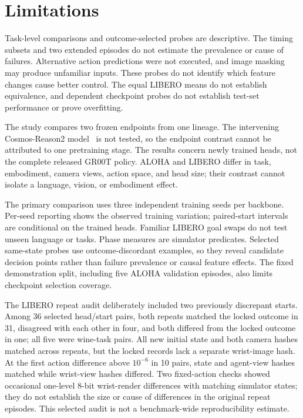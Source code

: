 \documentclass[conference]{IEEEtran}
\begin{document}
\clearpage
\twocolumn
\section{Limitations}
Task-level comparisons and outcome-selected probes are descriptive. The timing
subsets and two extended episodes do not estimate the prevalence or cause of
failures. Alternative action predictions were not executed, and image masking
may produce unfamiliar inputs. These probes do not identify which feature
changes cause better control. The equal LIBERO means do not establish
equivalence, and dependent checkpoint probes do not establish test-set
performance or prove overfitting.

The study compares two frozen endpoints from one lineage. The intervening
Cosmos-Reason2 model~\cite{groot17} is not tested, so the endpoint contrast cannot be
attributed to one pretraining stage. The results concern newly trained heads,
not the complete released GR00T policy. ALOHA and LIBERO differ in task,
embodiment, camera views, action space, and head size; their contrast cannot
isolate a language, vision, or embodiment effect.

The primary comparison uses three independent training seeds per backbone.
Per-seed reporting
shows the observed training variation; paired-start intervals are conditional
on the trained heads. Familiar LIBERO goal swaps do not test unseen language
or tasks.
Phase measures are simulator predicates. Selected same-state probes use
outcome-discordant examples, so they reveal candidate decision points rather
than failure prevalence or causal feature effects. The fixed demonstration
split, including five ALOHA validation episodes, also limits checkpoint
selection coverage.

The LIBERO repeat audit deliberately included two previously discrepant
starts. Among 36 selected head/start pairs, both repeats matched the locked
outcome in 31, disagreed with each other in four, and both differed from the
locked outcome in one; all five were wine-task pairs. All new initial state
and both camera hashes matched across repeats, but the locked records lack a
separate wrist-image hash. At the first action difference above $10^{-6}$ in
10 pairs, state and agent-view hashes matched while wrist-view hashes differed.
Two fixed-action checks showed occasional one-level 8-bit wrist-render
differences with matching simulator states; they do not establish the size
or cause of differences in the original repeat episodes. This selected audit
is not a benchmark-wide reproducibility estimate.
\end{document}
